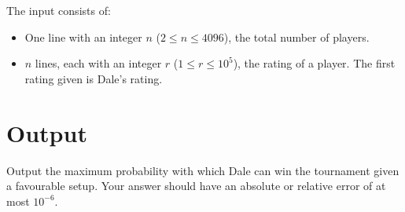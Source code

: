 The input consists of:
\begin{itemize}
  \item One line with an integer $n$ ($2 \le n \le 4096$), the total
    number of players.
  \item $n$ lines, each with an integer $r$ ($1 \le r \le 10^5$), the
    rating of a player. The first rating given is Dale's rating.
\end{itemize}


\section*{Output}

Output the maximum probability with which Dale can win the
tournament given a favourable setup. Your answer should have an absolute or
relative error of at most $10^{-6}$.
